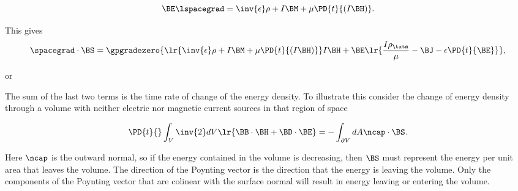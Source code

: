 \begin{dmath}\label{eqn:maxwellsEquations:660}
\BE \lspacegrad = \inv{\epsilon} \rho + I \BM + \mu \PD{t}{(I\BH)}.
\end{dmath}

This gives
\begin{dmath}\label{eqn:maxwellsEquations:680}
\spacegrad \cdot \BS
=
\gpgradezero
{
\lr{ \inv{\epsilon} \rho + I \BM + \mu \PD{t}{(I\BH)} } I \BH
+
\BE
\lr
{
\frac{I \rho_\txtm}{\mu} - \BJ - \epsilon \PD{t}{\BE}
}
}
,
\end{dmath}

or

The sum of the last two terms is the time rate of change of the energy density.
To illustrate this consider the change of energy density through a volume with neither electric nor magnetic current sources in that region of space

\begin{dmath}\label{eqn:maxwellsEquations:740}
\PD{t}{} \int_V
\inv{2} dV \lr{
\BB \cdot \BH
+ \BD \cdot \BE
}
=
-\int_{\partial V} dA \ncap \cdot \BS.
\end{dmath}

Here \( \ncap \) is the outward normal, so if the energy contained in the volume is decreasing, then \( \BS \) must represent the energy per unit area that leaves the volume.
The direction of the Poynting vector is the direction that the energy is leaving the volume.
Only the components of the Poynting vector that are colinear with the surface normal will result in energy leaving or entering the volume.

